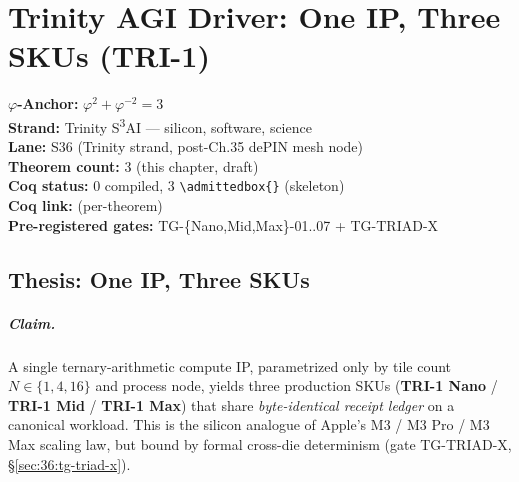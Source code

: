 
\chapter{Trinity AGI Driver: One IP, Three SKUs (TRI-1)}
\label{ch_36_tri1:ch:agi-driver}

\begin{tcolorbox}[colback=gold!5,colframe=gold!60,title=Chapter Anchor]
  \textbf{$\varphi$-Anchor:} $\varphi^2 + \varphi^{-2} = 3$ \\
  \textbf{Strand:} Trinity S\textsuperscript{3}AI --- silicon, software, science \\
  \textbf{Lane:} S36 (Trinity strand, post-Ch.35 dePIN mesh node) \\
  \textbf{Theorem count:} 3 (this chapter, draft) \\
  \textbf{Coq status:} 0 compiled, 3 \verb|\admittedbox{}| (skeleton) \\
  \textbf{Coq link:}  (per-theorem) \\
  \textbf{Pre-registered gates:} TG-\{Nano,Mid,Max\}-01..07 + TG-TRIAD-X
\end{tcolorbox}

\section{Thesis: One IP, Three SKUs}
\label{sec:36:thesis}

\paragraph{Claim.}
A single ternary-arithmetic compute IP, parametrized only by tile count
$N \in \{1, 4, 16\}$ and process node, yields three production SKUs
(\textbf{TRI-1 Nano} / \textbf{TRI-1 Mid} / \textbf{TRI-1 Max}) that share
\emph{byte-identical receipt ledger} on a canonical workload. This is the
silicon analogue of Apple's M3 / M3 Pro / M3 Max scaling law, but bound by
formal cross-die determinism (gate TG-TRIAD-X, \S\ref{sec:36:tg-triad-x}).

